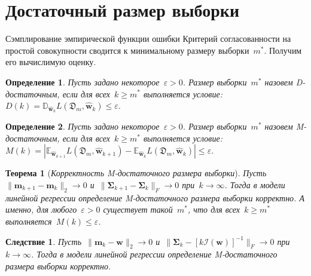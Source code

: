 \documentclass[10pt,pdf,hyperref={unicode}]{beamer}
\newtheorem{rustheorem}{Теорема}
\newtheorem{rusdefinition}{Определение}
\newtheorem{ruscorollary}{Следствие}
\begin{document}
\section{Достаточный размер выборки}
\begin{frame}{Сэмплирование эмпирической функции ошибки}
\justifying
Критерий согласованности на простой совокупности сводится к минимальному размеру выборки~$m^*$. Получим его вычислимую оценку.

\begin{rusdefinition}
    \justifying
    Пусть задано некоторое~$\varepsilon > 0$.
    Размер выборки~$m^*$ назовем D-достаточным, если для всех~$k\geqslant m^*$ выполняется условие:~$D(k) = \mathbb{D}_{\hat{\mathbf{w}}_{k}} L(\mathfrak{D}_m, \hat{\mathbf{w}}_{k}) \leqslant \varepsilon.$
\end{rusdefinition}

\begin{rusdefinition}
    \justifying
    Пусть задано некоторое~$\varepsilon > 0$.
    Размер выборки~$m^*$ назовем M-достаточным, если для всех~$k\geqslant m^*$ выполняется условие:~$M(k) = \left| \mathbb{E}_{\hat{\mathbf{w}}_{k+1}} L(\mathfrak{D}_m, \hat{\mathbf{w}}_{k+1}) - \mathbb{E}_{\hat{\mathbf{w}}_{k}} L(\mathfrak{D}_m, \hat{\mathbf{w}}_{k}) \right| \leqslant \varepsilon.$
\end{rusdefinition}

\begin{rustheorem}[\emph{Корректность M-достаточного размера выборки}]
    \justifying
    Пусть~$\|\mathbf{m}_{k+1} - \mathbf{m}_k\|_2 \to 0$ и~$\|\bm{\Sigma}_{k+1} - \bm{\Sigma}_k\|_{F}\to 0$ при~$k\to \infty$. 
    Тогда в модели линейной регрессии определение M-достаточного размера выборки корректно.
    А именно, для любого~$\varepsilon > 0$ существует такой~$m^*$, что для всех~$k\geqslant m^*$ выполняется~$M(k)\leqslant\varepsilon$.
\end{rustheorem}

\begin{ruscorollary}
    \justifying
    Пусть~$\|\mathbf{m}_k - \mathbf{w}\|_2\to 0$ и~$\|\bm{\Sigma}_k - \left[k\mathcal{I}(\mathbf{w})\right]^{-1}\|_{F}\to 0$ при~$k \to \infty$.
    Тогда в модели линейной регрессии определение M-достаточного размера выборки корректно.
\end{ruscorollary}
\end{frame}
\end{document}
